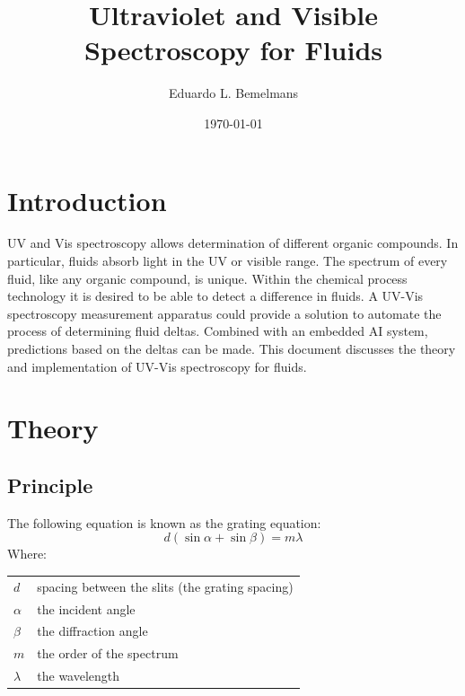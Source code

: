 \documentclass[aps,twocolumn,twoside,secnumarabic,balancelastpage,amsmath,amssymb,nofootinbib,hyperref=pdftex]{revtex4}
\makeatletter
\newenvironment{EqParameters}[1][]
  {#1 \begin{tabular}[t]{>{$}l<{$} @{${}={}$} l}}
  {\end{tabular}\\[\belowdisplayskip]}
\makeatother
\begin{document}
\title{Ultraviolet and Visible Spectroscopy for Fluids}
\author         {Eduardo L. Bemelmans}
\date{\today}


\begin{abstract}



\end{abstract}

\maketitle


\section{Introduction}
UV and Vis spectroscopy allows determination of different organic compounds. In particular, fluids absorb light in the UV or visible range. The spectrum of every fluid, like any organic compound, is unique. Within the chemical process technology it is desired to be able to detect a difference in fluids. A UV-Vis spectroscopy measurement apparatus could provide a solution to automate the process of determining fluid deltas. Combined with an embedded AI system, predictions based on the deltas can be made. This document discusses the theory and implementation of UV-Vis spectroscopy for fluids.

\section{Theory}
\subsection{Principle}

The following equation is known as the grating equation\cite{geqs}: %
\begin{equation}
   d(\sin{\alpha}+\sin{\beta})=m\lambda 
   \label{eq:gratingEquation1}
\end{equation}
Where:
\begin{EqParameters}
d    &  spacing between the slits (the grating spacing) \\
\alpha &  the incident angle \\
\beta &  the diffraction angle \\
m    &  the order of the spectrum \\
\lambda & the wavelength \\
\end{EqParameters}
\end{document}

